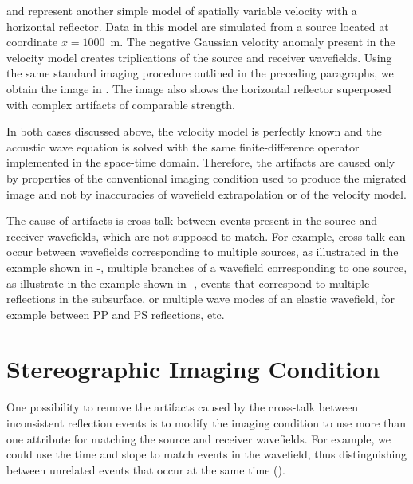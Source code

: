  and  represent another simple model 
of spatially variable velocity with a horizontal reflector. Data in
this model are simulated from a source located at coordinate
$x=1000$~m. The negative Gaussian velocity anomaly present in the
velocity model creates triplications of the source and receiver
wavefields. Using the same standard imaging procedure outlined in the
preceding paragraphs, we obtain the image in . The image
also shows the horizontal reflector superposed with complex artifacts
of comparable strength.

In both cases discussed above, the velocity model is perfectly known
and the acoustic wave equation is solved with the same
finite-difference operator implemented in the space-time domain.
Therefore, the artifacts are caused only by properties of the
conventional imaging condition used to produce the migrated image and
not by inaccuracies of wavefield extrapolation or of the velocity
model.

The cause of artifacts is cross-talk between events present in the
source and receiver wavefields, which are not supposed to match. For
example, cross-talk can occur between wavefields corresponding to
multiple sources, as illustrated in the example shown in
-, multiple branches of a wavefield
corresponding to one source, as illustrate in the example shown in
-, events that correspond to multiple
reflections in the subsurface, or multiple wave modes of an elastic
wavefield, for example between PP and PS reflections, etc.


\section{Stereographic Imaging Condition}
One possibility to remove the artifacts caused by the cross-talk
between inconsistent reflection events is to modify the imaging
condition to use more than one attribute for matching the source and
receiver wavefields. For example, we could use the time and slope to
match events in the wavefield, thus distinguishing between unrelated
events that occur at the same time ().

